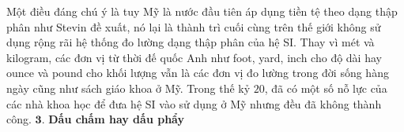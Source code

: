 \begin{multicols}{2}
	\vskip 0.3cm
	\vskip 0.3cm
	Một điều đáng chú ý là tuy Mỹ là nước đầu tiên áp dụng tiền tệ theo dạng thập phân như Stevin đề xuất, nó lại là thành trì cuối cùng trên thế giới không sử dụng rộng rãi hệ thống đo lường dạng thập phân của hệ SI. Thay vì mét và kilogram, các đơn vị từ thời đế quốc Anh như foot, yard, inch cho độ dài hay ounce và pound cho khối lượng vẫn là các đơn vị đo lường trong đời sống hàng ngày cũng như sách giáo khoa ở Mỹ. Trong thế kỷ $20$, đã có một số nỗ lực của các nhà khoa học để đưa hệ SI vào sử dụng ở Mỹ nhưng đều đã không thành công.
	\vskip 0.1cm
	\columnbreak
	$\pmb{3.}$ \textbf{\color{toanhocdoisong}Dấu chấm hay dấu phẩy}

\end{multicols}
